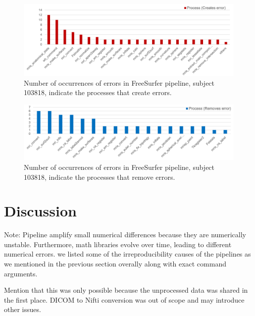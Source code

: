 \documentclass{article}
\newcommand{\note}[2]{\color{blue}Note: #1\color{black}}
\begin{document}
{\begin{figure}[H] 
\centering
  \includegraphics[scale=0.6]{images/fs_error_table.png} 
  \caption{Number of occurrences of errors in FreeSurfer pipeline, 
subject 103818, indicate the processes that create errors.}
  \label{fig:fs_error_table}
\end{figure}

\begin{figure}[H]
\centering
  \includegraphics[scale=0.5]{images/fs_remove_table.png} 
  \caption{Number of occurrences of errors in FreeSurfer pipeline, 
subject 103818, indicate the processes that remove errors.}
  \label{fig:fs_remove_table}
\end{figure}


\section{Discussion}

\note{Pipeline amplify small numerical differences because they are numerically 
unstable. Furthermore, math libraries evolve over time, leading to 
different numerical errors. we listed some of the irreproducibility 
causes of the pipelines as we mentioned in the previous section 
overally along with exact command arguments.

Mention that this was only possible because the unprocessed data was 
shared in the first place. DICOM to Nifti conversion was out of scope 
and may introduce other issues.}

\section{Conclusion}

}
\end{document}
